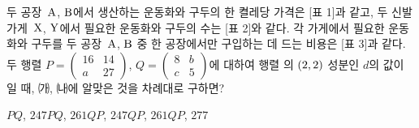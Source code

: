 두 공장~$\mathrm{A}$, $\mathrm{B}$에서 생산하는 운동화와 구두의 한 켤레당 가격은 [표 1]과 같고, 두 신발 가게~$\mathrm{X}$, $\mathrm{Y}$에서 필요한 운동화와 구두의 수는 [표 2]와 같다. 각 가게에서 필요한 운동화와 구두를 두 공장~$\mathrm{A}$, $\mathrm{B}$ 중 한 공장에서만 구입하는 데 드는 비용은 [표 3]과 같다. 두 행렬 $P=\begin{pmatrix} 16 & 14 \\ a & 27 \end{pmatrix}$, $Q=\begin{pmatrix} 8 & b \\ c & 5 \end{pmatrix}$에 대하여 행렬 의 $(2{,}\mkern3mu\mathopen{}2)$ 성분인 $d$의 값이 일 때, ㈎, ㈏에 알맞은 것을 차례대로 구하면?
\par\smallskip\begin{center}\resizebox{\ifdim\width>\linewidth\linewidth\else\width\fi}{!}{}\end{center}
\begin{choicesii}{$PQ$, $247$}{$PQ$, $261$}{$QP$, $247$}{$QP$, $261$}{$QP$, $277$}\end{choicesii}
